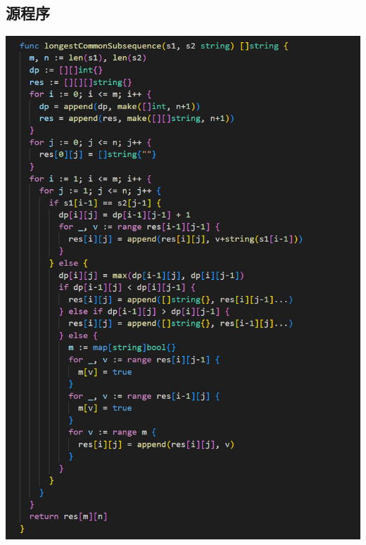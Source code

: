 \documentclass{ctexart}
\begin{document}
\subsection{源程序}
\includegraphics[width=\textwidth]{code.png}
\end{document}
